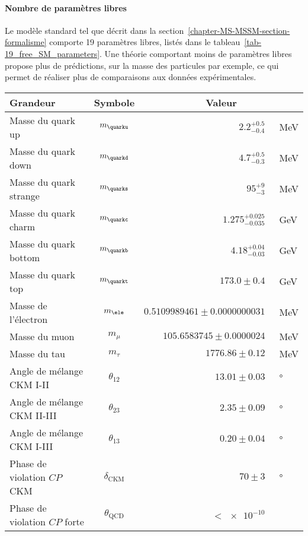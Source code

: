 \paragraph{Nombre de paramètres libres}
Le modèle standard tel que décrit dans la section~\ref{chapter-MS-MSSM-section-formalisme} comporte 19 paramètres libres, listés dans le tableau~\ref{tab-19_free_SM_parameters}.
Une théorie comportant moins de paramètres libres propose plus de prédictions, sur la masse des particules par exemple, ce qui permet de réaliser plus de comparaisons aux données expérimentales.
\begin{table}[h]
\centering
\begin{tabular}{lcrl}
\toprule
Grandeur & Symbole & \multicolumn{2}{c}{Valeur} \\
\midrule
Masse du quark up & $m_{\quarku}$ & $\num{2.2}^{+\num{0.5}}_{-\num{0.4}}$ & \SI{}{\MeV} \\
Masse du quark down & $m_{\quarkd}$ & $\num{4.7}^{+\num{0.5}}_{-\num{0.3}}$ & \SI{}{\MeV} \\
Masse du quark strange & $m_{\quarks}$ & $\num{95}^{+\num{9}}_{-\num{3}}$ & \SI{}{\MeV} \\
Masse du quark charm & $m_{\quarkc}$ & $\num{1.275}^{+\num{0.025}}_{-\num{0.035}}$ & \SI{}{\GeV} \\
Masse du quark bottom & $m_{\quarkb}$ & $\num{4.18}^{+\num{0.04}}_{-\num{0.03}}$ & \SI{}{\GeV} \\
Masse du quark top & $m_{\quarkt}$ & $\num{173.0}\pm\num{0.4}$ & \SI{}{\GeV} \\
Masse de l'électron & $m_{\ele}$ & $\num{0.5109989461}\pm\num{0.0000000031}$ & \SI{}{\MeV} \\
Masse du muon & $m_{\mu}$ & $\num{105.6583745}\pm\num{0.0000024}$ & \SI{}{\MeV} \\
Masse du tau & $m_{\tau}$ & $\num{1776.86}\pm\num{0.12}$ & \SI{}{\MeV} \\
Angle de mélange CKM I-II & $\theta_{12}$ & $\num{13.01}\pm\num{0.03}$ & \SI{}{\degree} \\
Angle de mélange CKM II-III & $\theta_{23}$ & $\num{2.35}\pm\num{0.09}$ & \SI{}{\degree} \\
Angle de mélange CKM I-III & $\theta_{13}$ & $\num{0.20}\pm\num{0.04}$ & \SI{}{\degree} \\
Phase de violation $CP$ CKM & $\delta_{\text{CKM}}$ & $\num{70}\pm\num{3}$ & \SI{}{\degree} \\
Phase de violation $CP$ forte & $\theta_{\text{QCD}}$ & $<\num{e-10}$ & \\

\end{tabular}
\end{table}
